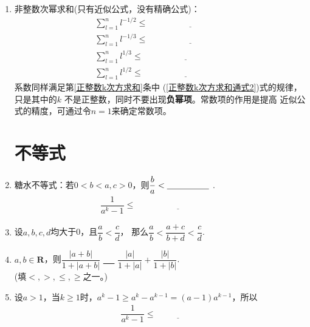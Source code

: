 \documentclass{article}
\newif\ifte
\renewcommand\leq\leqslant
\renewcommand\geq\geqslant
\begin{document}
\begin{multicols}{2}
\begin{enumerate}[leftmargin=20pt]
\item 非整数次幂求和(只有近似公式，没有精确公式)：
\begin{align*}
    &\sum\limits_{l=1}^{n} l^{-1/2}\leq \underline{\ \ifte 
       2n^{1/2}-1 \else \hspace{4cm} \fi\ }  \\  
    &\sum\limits_{l=1}^{n} l^{-1/3}\leq \underline{\ \ifte 
      \dfrac{3}{2}n^{2/3}-\dfrac{1}{2} \else \hspace{4cm} \fi\ }  \\ 
    &\sum\limits_{l=1}^{n} l^{1/3}\leq \underline{\ \ifte 
       \dfrac{3}{4}n^{4/3}+\dfrac{1}{2}n^{1/3}-\dfrac{1}{4}
       \else \hspace{4cm} \fi\ }  \\
    &\sum\limits_{l=1}^{n} l^{1/2}\leq \underline{\ \ifte 
        \dfrac{2}{3}n^{3/2} +\dfrac{1}{2}n^{1/2}-
        \dfrac{1}{6} \else \hspace{4cm} \fi\ }
\end{align*}
系数同样满足第\ref{正整数k次方求和}条中
(\ref{正整数k次方求和通式2})式的规律，只是其中的$ k $
不是正整数，同时不要出现\textbf{负幂项}。常数项的作用是提高
近似公式的精度，可通过令$ n=1 $来确定常数项。

\section{不等式}

\item 糖水不等式：若$ 0<b<a,c>0 $，则$ \dfrac{b}{a}<
\underline{\ \ifte \dfrac{b+c}{a+c}\else \hspace{1.5cm} \fi\ } $ .
\begin{gather*}
    \dfrac{1}{a^k-1}\leq \underline{\ \ifte 
    \dfrac{1+1}{a^k-1+1}=\dfrac{2}{a^{k}} \else \hspace{4cm} \fi\ }
\end{gather*}

\item 设$ a,b,c,d $均大于0，且$ \dfrac{a}{b}<\dfrac{c}{d} $，
那么$ \dfrac{a}{b}<\dfrac{a+c}{b+d}<\dfrac{c}{d} $. 

\item $ a,b\in\mathbf{R} $，则$ \dfrac{|a+b|}{1+|a+b|} $ 
\underline{\ \ifte $ \leq $ \else \hspace{1cm} \fi\ } 
 $ \dfrac{|a|}{1+|a|}+\dfrac{|b|}{1+|b|} $. \\ 
 (填$ <,>,\leq,\geq $之一。)

\item 设$ a>1 $，当$ k\geq 1 $时，$ a^k-1\geq a^k-a^{k-1}=(a-1)a^{k-1}$，所以
\begin{gather*}
    \dfrac{1}{a^k-1}\leq \underline{\ \ifte 
    \dfrac{1}{(a-1)a^{k-1}} \else \hspace{2cm} \fi\ }
\end{gather*}


\end{enumerate}
\end{multicols}
\end{document}

